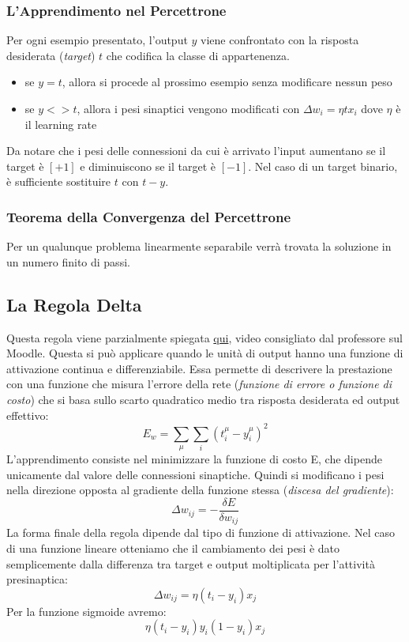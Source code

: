 \documentclass[12pt, a4paper]{article}
\begin{document}
\subsubsection{L'Apprendimento nel Percettrone}
Per ogni esempio presentato, l'output \(y\) viene confrontato con la risposta desiderata (\textit{target}) \(t\) che codifica la classe di appartenenza.
\begin{itemize}
    \item se \(y=t\), allora si procede al prossimo esempio senza modificare nessun peso
    \item se \(y<>t\), allora i pesi sinaptici vengono modificati con \(\Delta w_i=\eta tx_i\) dove \(\eta\) è il learning rate 
\end{itemize}

Da notare che i pesi delle connessioni da cui è arrivato l'input aumentano se il target è \([+1]\) e diminuiscono se il target è \([-1]\). Nel caso di un target binario, è sufficiente sostituire \(t\) con \(t-y\).\\

\subsubsection{Teorema della Convergenza del Percettrone}
Per un qualunque problema linearmente separabile verrà trovata la soluzione in un numero finito di passi.

\subsection{La Regola Delta}
Questa regola viene parzialmente spiegata \href{https://www.youtube.com/watch?v=IHZwWFHWa-w}{qui}, video consigliato dal professore sul Moodle.
Questa si può applicare quando le unità di output hanno una funzione di attivazione continua e differenziabile. Essa permette di descrivere la prestazione con una funzione che misura l'errore della rete (\textit{funzione di errore o funzione di costo}) che si basa sullo scarto quadratico medio tra risposta desiderata ed output effettivo: \[E_w=\sum_\mu \sum_i (t^\mu_i-y^\mu_i)^2\]
L'apprendimento consiste nel minimizzare la funzione di costo E, che dipende unicamente dal valore delle connessioni sinaptiche. Quindi si modificano i pesi nella direzione opposta al gradiente della funzione stessa (\textit{discesa del gradiente}): \[\Delta w_{ij}= - \frac{\delta E}{\delta w_{ij}}\]
La forma finale della regola dipende dal tipo di funzione di attivazione. Nel caso di una funzione lineare otteniamo che il cambiamento dei pesi è dato semplicemente dalla differenza tra target e output moltiplicata per l'attività presinaptica: \[\Delta w_{ij}=\eta (t_i-y_i)x_j\]
Per la funzione sigmoide avremo: \[\eta (t_i-y_i)y_i(1-y_i)x_j\]
\end{document}
